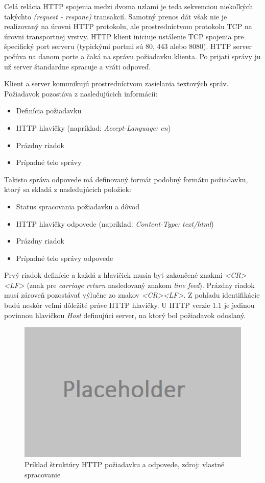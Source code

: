 \documentclass[
  digital, %
  table,   %
  lof,     %
  nolot,   %
  nocover
]{fithesis3}
\begin{document}
Celá relácia HTTP spojenia medzi dvoma uzlami je teda sekvenciou niekoľkých
takýchto \textit{(request - respone)} transakcií. Samotný prenos dát však nie
je realizovaný na úrovni HTTP protokolu, ale prostredníctvom protokolu TCP
na úrovni transportnej vrstvy. HTTP klient iniciuje ustálenie TCP spojenia pre
špecifický port serveru (typickými portmi sú 80, 443 alebo 8080). HTTP server
počúva na danom porte a čaká na správu požiadavku klienta. Po prijatí správy ju
už server štandardne spracuje a vráti odpoveď. 

Klient a server komunikujú prostredníctvom zasielania textových správ.
Požiadavok pozostáva z nasledujúcich informácií: 
\begin{itemize}
	\item Definícia požiadavku
	\item HTTP hlavičky (napríklad: \textit{Accept-Language: en})
	\item Prázdny riadok
	\item Prípadné telo správy
\end{itemize}

Takisto správa odpovede má definovaný formát podobný formátu požiadavku, ktorý
sa skladá z nasledujúcich položiek:
\begin{itemize}
	\item Status spracovania požiadavku a dôvod
	\item HTTP hlavičky odpovede (napríklad: \textit{Content-Type: text/html})
	\item Prázdny riadok
	\item Prípadné telo správy odpovede
\end{itemize}

Prvý riadok definície a každá z hlavičiek musia byť zakončené znakmi
\textit{<CR><LF>}
(znak pre \textit{carriage return} nasledovaný znakom \textit{line feed}).
Prázdny riadok musí zároveň pozostávať výlučne zo znakov \textit{<CR><LF>}.
Z pohľadu identifikácie budú neskôr veľmi dôležité práve HTTP hlavičky. U HTTP
verzie 1.1 je jedinou povinnou hlavičkou \textit{Host} definujúci server, na
ktorý bol požiadavok odoslaný.

\begin{figure}[h]
  \centering
    \includegraphics[width=.80\textwidth]{images/net-http.png}
  \caption{Príklad štruktúry HTTP požiadavku a odpovede, zdroj: vlastné
  spracovanie}
  \label{fig:net-http}
\end{figure}
\end{document}
